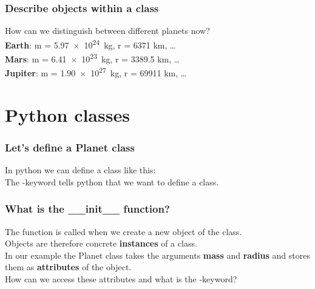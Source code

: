 \documentclass{beamer}
\begin{document}
\begin{frame}
  \frametitle{Describe objects within a class}
  How can we distinguish between different planets now?\\
  \vspace{5mm}
  \textbf{Earth}: m = \SI{5.97e24}{kg}, r = 6371 km, \dots\\
  \vspace{5mm}
  \textbf{Mars}: m = \SI{6.41e23}{kg}, r = 3389.5 km, \dots\\
  \vspace{5mm}
  \textbf{Jupiter}: m = \SI{1.90e27}{kg}, r = 69911 km, \dots\\
\end{frame}
\section{Python classes}
\begin{frame}
  \frametitle{Let's define a Planet class}
  In python we can define a class like this:\\
  
  \vspace{5mm}
  The \textbf{}-keyword tells python that we want to define a class.\\
\end{frame}
\begin{frame}
  \frametitle{What is the \_\_init\_\_ function?}
  The \textbf{} function is called when we create a new object of the class.\\
  \vspace{5mm}
  Objects are therefore concrete \textbf{instances} of a class.\\
  \vspace{5mm}
  In our example the Planet class takes the arguments \textbf{mass} and \textbf{radius} and stores them as \textbf{attributes} of the object.\\
  \vspace{5mm}
  How can we access these attributes and what is the \textbf{}-keyword?\\
\end{frame}
\end{document}
